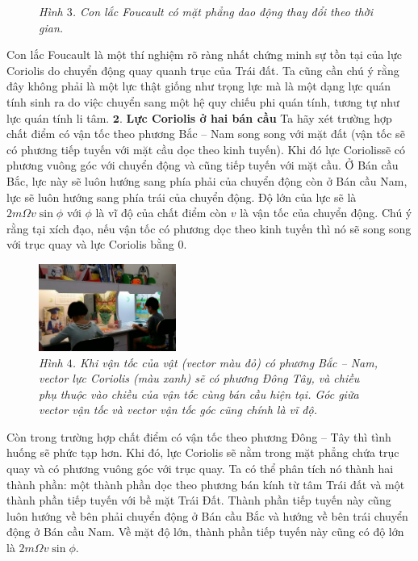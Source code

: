 \begin{multicols}{2}
\begin{figure}[H]
		\caption{\small\textit{\color{timhieukhoahoc}Hình $3$. Con lắc Foucault có mặt phẳng dao động thay đổi theo thời gian.}}
		\vspace*{-10pt}
	\end{figure}
	Con lắc Foucault là một thí nghiệm rõ ràng nhất chứng minh sự tồn tại của lực Coriolis \linebreak do chuyển động quay quanh trục của Trái đất. Ta cũng cần chú ý rằng đây không phải là một lực thật giống như trọng lực mà là một dạng lực quán tính sinh ra do việc chuyển sang một hệ quy chiếu phi quán tính, tương tự như lực quán tính li tâm.
	\vskip 0.1cm
	$\pmb{2.}$ \textbf{Lực Coriolis ở hai bán cầu}
	\vskip 0.1cm
	Ta hãy xét trường hợp chất điểm có vận tốc theo phương Bắc -- Nam song song với mặt đất (vận tốc sẽ có phương tiếp tuyến với mặt cầu dọc theo kinh tuyến). Khi đó lực Coriolis\linebreak sẽ có phương vuông góc với chuyển động và cũng tiếp tuyến với mặt cầu. Ở Bán cầu Bắc, lực này sẽ luôn hướng sang phía phải của chuyển động còn ở Bán cầu Nam, lực sẽ luôn hướng sang phía trái của chuyển động. Độ lớn của lực sẽ là $2m\Omega v\sin\phi$ với $\phi$ là vĩ độ của chất điểm còn $v$ là vận tốc của chuyển động. Chú ý rằng tại xích đạo, nếu vận tốc có phương dọc theo kinh tuyến thì nó sẽ song song với trục quay và lực Coriolis bằng $0$.
	\begin{figure}[H]
		\vspace*{-5pt}
		\centering
		\captionsetup{labelformat= empty, justification=centering}
		\includegraphics[width= 0.4\textwidth]{16}
		\caption{\small\textit{\color{timhieukhoahoc}Hình $4$. Khi vận tốc của vật (vector màu đỏ) có phương Bắc -- Nam, vector lực Coriolis (màu xanh) sẽ có phương Đông Tây, và chiều phụ thuộc vào chiều của vận tốc cùng bán cầu hiện tại. Góc giữa vector vận tốc và vector vận tốc góc cũng chính là vĩ độ.}}
		\vspace*{-10pt}
	\end{figure}
	Còn trong trường hợp chất điểm có vận tốc theo phương Đông -- Tây thì tình huống sẽ phức tạp hơn. Khi đó, lực Coriolis sẽ nằm trong mặt phẳng chứa trục quay và có phương vuông góc với trục quay. Ta có thể phân tích nó thành hai thành phần: một thành phần dọc theo phương bán kính từ tâm Trái đất và một thành phần tiếp tuyến với bề mặt Trái Đất. Thành phần tiếp tuyến này cũng luôn hướng về bên phải chuyển động ở Bán cầu Bắc và hướng về bên trái chuyển động ở Bán cầu Nam. Về mặt độ lớn, \linebreak thành phần tiếp tuyến này cũng có độ lớn là $2m\Omega v \sin\phi$.

\end{multicols}
